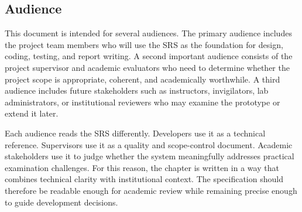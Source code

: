 \subsection{Audience}

This document is intended for several audiences. The primary audience includes the project team members who will use the SRS as the foundation for design, coding, testing, and report writing. A second important audience consists of the project supervisor and academic evaluators who need to determine whether the project scope is appropriate, coherent, and academically worthwhile. A third audience includes future stakeholders such as instructors, invigilators, lab administrators, or institutional reviewers who may examine the prototype or extend it later.

Each audience reads the SRS differently. Developers use it as a technical reference. Supervisors use it as a quality and scope-control document. Academic stakeholders use it to judge whether the system meaningfully addresses practical examination challenges. For this reason, the chapter is written in a way that combines technical clarity with institutional context. The specification should therefore be readable enough for academic review while remaining precise enough to guide development decisions.


